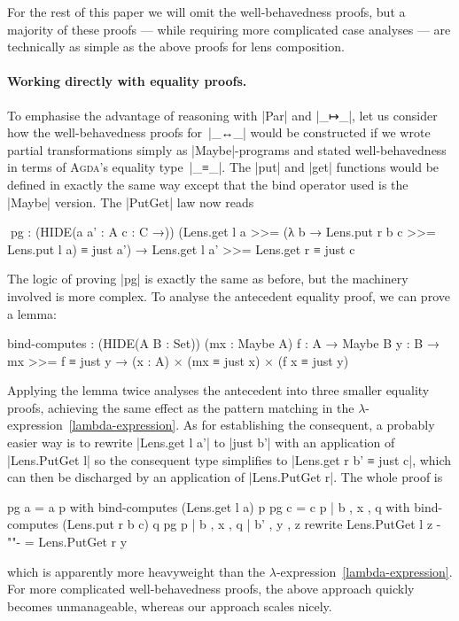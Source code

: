 \documentclass{sigplanconf}
\newcommand{\ucomma}{\kern1pt, }
\newcommand{\uperiod}{\kern1pt. }
\newcommand{\Agda}{\textsc{Agda}}
\begin{document}
For the rest of this paper we will omit the well-behavedness proofs, but a majority of these proofs --- while requiring more complicated case analyses --- are technically as simple as the above proofs for lens composition.

\paragraph{Working directly with equality proofs.}
To emphasise the advantage of reasoning with |Par| and |_↦_|\ucomma let us consider how the well-behavedness proofs for~|_↔_| would be constructed if we wrote partial transformations simply as |Maybe|-programs and stated well-behavedness in terms of \Agda's equality type~|_≡_|\uperiod
The |put| and |get| functions would be defined in exactly the same way except that the bind operator used is the |Maybe| version.
The |PutGet| law now reads
\begin{code}
^^^pg :  (HIDE({a a' : A} {c : C} →))
           (Lens.get l a >>= (λ b →
             Lens.put r b c >>= Lens.put l a) ≡ just a') →
           Lens.get l a' >>= Lens.get r ≡ just c
\end{code}
The logic of proving |pg| is exactly the same as before, but the machinery involved is more complex.
To analyse the antecedent equality proof, we can prove a lemma:
\begin{code}
bind-computes :
  (HIDE({A B : Set})) (mx : Maybe A) {f : A → Maybe B} {y : B} →
  mx >>= f ≡ just y →
  (x : A) × (mx ≡ just x) × (f x ≡ just y)
\end{code}
Applying the lemma twice analyses the antecedent into three smaller equality proofs, achieving the same effect as the pattern matching in the $\lambda$-expression~\autoref{lambda-expression}.
As for establishing the consequent, a probably easier way is to rewrite |Lens.get l a'| to |just b'| with an application of |Lens.PutGet l| so the consequent type simplifies to |Lens.get r b' ≡ just c|, which can then be discharged by an application of |Lens.PutGet r|.
The whole proof is
\begin{code}
pg {a  = a  }  p with bind-computes (Lens.get l a) p
pg {c  = c  }  p | b , x , q with bind-computes (Lens.put r b c) q
pg             p | b , x , q | b' , y , z rewrite Lens.PutGet l z
{-"\hfill"-} = Lens.PutGet r y
\end{code}
which is apparently more heavyweight than the $\lambda$-expression~\autoref{lambda-expression}.
For more complicated well-behavedness proofs, the above approach quickly becomes unmanageable, whereas our approach scales nicely.
\end{document}
